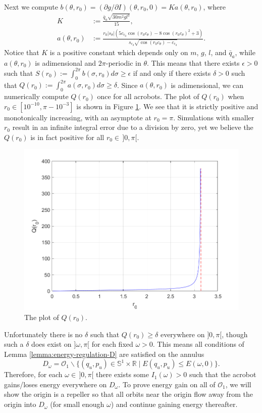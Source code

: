 \documentclass[journal,twoside,web, onecolumn, draftcls]{ieeecolor}
\newcommand*{\R}{\mathbb{R}}
\newcommand*{\Sone}{\mathbb{S}^1}
\newcommand*{\SxR}{\Sone \times \R}
\begin{document}
Next we compute
\(b(\theta,r_0) = (\partial g/\partial I)(\theta, r_0, 0) = K a(\theta,r_0)\),
where
\begin{align*}
    K &:= \frac{\bar{q}_a \sqrt{30m^2g l^3}}{15}
    , \\
    a(\theta,r_0) &:= \frac{
        r_0 |s_\theta| \left(
        5 c_{r_0} \cos(r_0 c_\theta) - 8 \cos(r_0c_\theta)^2 + 3
    \right)
    }{
    s_{r_0}\sqrt{\cos(r_0c_\theta) - c_{r_0}}
    }
    .
\end{align*}
Notice that \(K\) is a positive constant which depends only on
\(m\), \(g\), \(l\), and \(\bar{q}_a\), while \(a(\theta,r_0)\) is adimensional
and \(2\pi\)-periodic in \(\theta\).
This means that there exists \(\epsilon > 0\) such that 
\(S(r_0) := \int_0^{2\pi} b(\sigma,r_0)d\sigma \geq \epsilon\)
if and only if there exists \(\delta > 0\) such that 
\(Q(r_0) := \int_0^{2\pi} a(\sigma,r_0) d\sigma \geq \delta\).
Since \(a(\theta,r_0)\) is adimensional, we can numerically compute \(Q(r_0)\)
once for all acrobots.
The plot of \(Q(r_0)\) when \(r_0 \in [10^{-10}, \pi - 10^{-3}]\) is shown in
Figure \ref{fig:acrobot-Q}.
We see that it is strictly positive and monotonically increasing, with an
asymptote at \(r_0 = \pi\).
Simulations with smaller \(r_0\) result in an infinite integral error due to a
division by zero, yet we believe the \(Q(r_0)\) is in fact positive for all 
\(r_0 \in \, ]0,\pi[\).
\begin{figure}
    \centering
    \includegraphics[width=0.8\linewidth]{Qro.png}
    \caption{The plot of \(Q(r_0)\).}
    \label{fig:acrobot-Q}
\end{figure}

Unfortunately there is no \(\delta\) such that \(Q(r_0) \geq \delta\)
everywhere on \(]0,\pi[\), though such a \(\delta\) does exist 
on \(]\omega,\pi[\) for each fixed \(\omega > 0\).
This means all conditions of Lemma \ref{lemma:energy-regulation-D}
are satisfied on the annulus
\[
    D_\omega = \mathcal{O}_1 \backslash 
    \{(q_u,p_u) \in \SxR \mid E(q_u,p_u) \leq E(\omega,0)\}
    .
\]
Therefore, for each \(\omega \in \, ]0,\pi[\) there exists some 
\(I_1(\omega) > 0\) such that the acrobot gains/loses energy everywhere on
\(D_\omega\).
To prove energy gain on all of \(\mathcal{O}_1\), we will show the origin is a
repeller so that all orbits near the origin flow away from the origin into
\(D_\omega\) (for small enough \(\omega\)) and continue gaining energy
thereafter.
\end{document}
